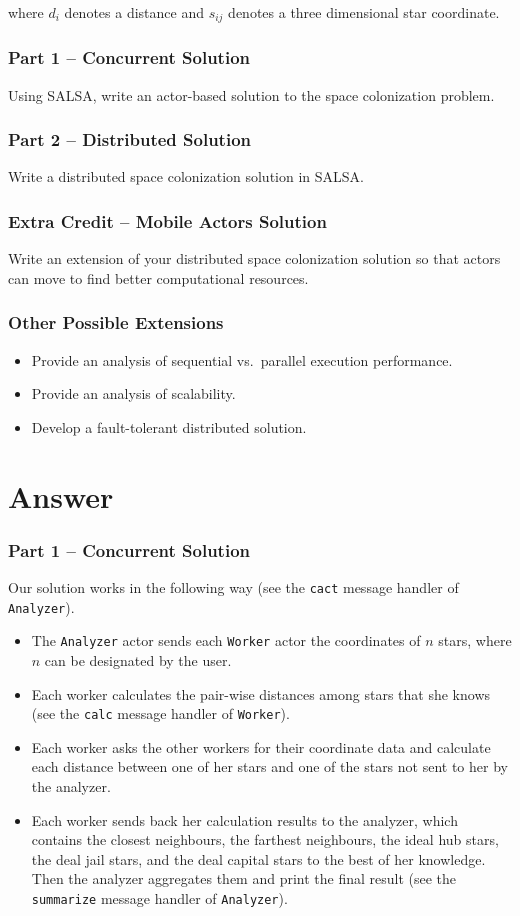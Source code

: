 \documentclass[12pt,letterpaper]{article}
\begin{document}
where $d_i$ denotes a distance and $s_{ij}$ denotes a three dimensional star coordinate. 

\section*{Part 1 -- Concurrent Solution}
Using SALSA, write an actor-based solution to the space colonization problem.

\section*{Part 2 -- Distributed Solution}
Write a distributed space colonization solution in SALSA.

\section*{Extra Credit -- Mobile Actors Solution}
Write an extension of your distributed space colonization solution so that actors can move to find better computational resources. 

\section*{Other Possible Extensions}
\begin{itemize}
\item Provide an analysis of sequential vs.~parallel execution performance.
\item Provide an analysis of scalability.
\item Develop a fault-tolerant distributed solution.
\end{itemize}

\part*{Answer}
\section*{Part 1 -- Concurrent Solution}
Our solution works in the following way (see the \texttt{cact} message handler of \texttt{Analyzer}). 
\begin{itemize}
\item The \texttt{Analyzer} actor sends each \texttt{Worker} actor the coordinates of $n$ stars, where $n$ can be designated by the user. 
\item Each worker calculates the pair-wise distances among stars that she knows (see the \texttt{calc} message handler of \texttt{Worker}).
\item Each worker asks the other workers for their coordinate data and calculate each distance between one of her stars and one of the stars not sent to her by the analyzer.
\item Each worker sends back her calculation results to the analyzer, which contains the closest neighbours, the farthest neighbours, the ideal hub stars, the deal jail stars, and the deal capital stars to the best of her knowledge. Then the analyzer aggregates them and print the final result (see the \texttt{summarize} message handler of \texttt{Analyzer}).
\end{itemize}
\end{document}
